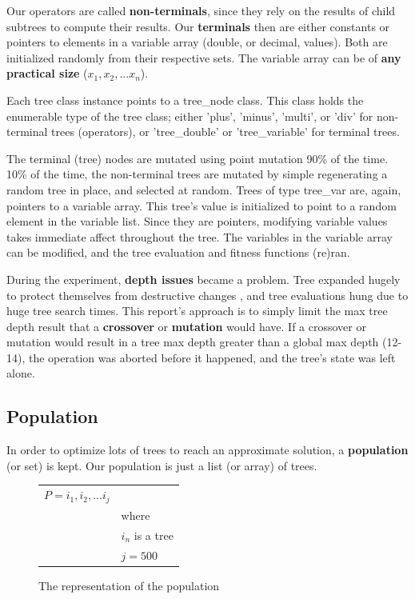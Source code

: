 \documentclass[12pt]{article}
\begin{document}
Our operators are called \textbf{non-terminals}, since they rely on the results of child subtrees to compute their results. Our \textbf{terminals} then are either constants or pointers to elements in a variable array (double, or decimal, values). Both are initialized randomly from their respective sets. The variable array can be of \textbf{any practical size} (${x_1, x_2, ... x_n}$).

Each tree class instance points to a tree\_node class. This class holds the enumerable type of the tree class; either 'plus', 'minus', 'multi', or 'div' for non-terminal trees (operators), or 'tree\_double' or 'tree\_variable' for terminal trees.

The terminal (tree) nodes are mutated using point mutation 90\% of the time. 10\% of the time, the non-terminal trees are mutated by simple regenerating a random tree in place, and selected at random. Trees of type tree\_var are, again, pointers to a variable array. This tree's value is initialized to point to a random element in the variable list. Since they are pointers, modifying variable values takes immediate affect throughout the tree. The variables in the variable array can be modified, and the tree evaluation and fitness functions (re)ran.

During the experiment, \textbf{depth issues} became a problem. Tree expanded hugely to protect themselves from destructive changes \cite{growth}, and tree evaluations hung due to huge tree search times. This report's approach is to simply limit the max tree depth result that a \textbf{crossover} or \textbf{mutation} would have. If a crossover or mutation would result in a tree max depth greater than a global max depth (12-14), the operation was aborted before it happened, and the tree's state was left alone.

\subsection{Population}
\label{sec:population}
In order to optimize lots of trees to reach an approximate solution, a \textbf{population} (or set) is kept. Our population is just a list (or array) of trees. 

\begin{figure}[!h]
        \begin{center}
		\begin{tabular}{r l}
	                $ P = i_1, i_2, ... i_j $	& \\
								& where \\
								& $ i_n $ is a tree\\
								& $ j = 500 $ \\
		\end{tabular} 
               \caption{The representation of the population}
                \label{population}
        \end{center}
\end{figure}
\end{document}
